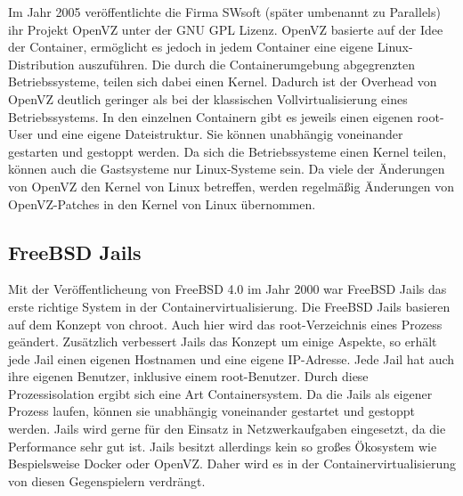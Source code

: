 Im Jahr 2005 veröffentlichte die Firma SWsoft (später umbenannt zu Parallels) ihr Projekt OpenVZ unter der GNU GPL Lizenz. OpenVZ basierte auf der Idee der Container, ermöglicht es jedoch in jedem Container eine eigene Linux-Distribution auszuführen.
Die durch die Containerumgebung abgegrenzten Betriebssysteme, teilen sich dabei einen Kernel. Dadurch ist der Overhead von OpenVZ deutlich geringer als bei der klassischen Vollvirtualisierung eines Betriebssystems.
In den einzelnen Containern gibt es jeweils einen eigenen root-User und eine eigene Dateistruktur.
Sie können unabhängig voneinander gestarten und gestoppt werden.
Da sich die Betriebssysteme einen Kernel teilen, können auch die Gastsysteme nur Linux-Systeme sein.
Da viele der Änderungen von OpenVZ den Kernel von Linux betreffen, werden regelmäßig Änderungen von OpenVZ-Patches in den Kernel von Linux übernommen.\cite{OpenVzNews, IEEE4803091,OpenVzHist}


\subsection*{FreeBSD Jails}
\label{sec:jails}
Mit der Veröffentlicheung von FreeBSD 4.0 im Jahr 2000 war FreeBSD Jails das erste richtige System in der Containervirtualisierung.
Die FreeBSD Jails basieren auf dem Konzept von chroot. Auch hier wird das root-Verzeichnis eines Prozess geändert. Zusätzlich verbessert Jails das Konzept um einige Aspekte, so erhält jede Jail einen eigenen Hostnamen	und eine eigene IP-Adresse. Jede Jail hat auch ihre eigenen Benutzer, inklusive einem root-Benutzer. \cite{FreeBSDHB14} Durch diese Prozessisolation ergibt sich eine Art Containersystem. Da die Jails als eigener Prozess laufen, können sie unabhängig voneinander gestartet und gestoppt werden.  Jails wird gerne für den Einsatz in Netzwerkaufgaben eingesetzt, da die Performance sehr gut ist. Jails besitzt allerdings kein so großes Ökosystem wie Bespielsweise Docker oder OpenVZ. Daher wird es in der Containervirtualisierung von diesen Gegenspielern verdrängt.


